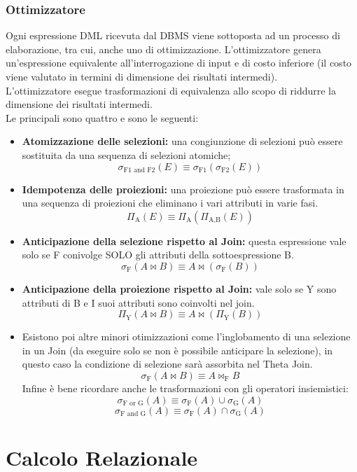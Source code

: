 \documentclass{report}
\begin{document}
\subsection{Ottimizzatore}
Ogni espressione DML ricevuta dal DBMS viene sottoposta ad un processo di elaborazione, tra cui, anche uno di ottimizzazione. L’ottimizzatore genera un’espressione equivalente all’interrogazione di input e di costo inferiore (il costo viene valutato in termini di dimensione dei risultati intermedi).\\
L’ottimizzatore esegue trasformazioni di equivalenza allo scopo di riddurre la dimensione dei risultati intermedi.\\
Le principali sono quattro e sono le seguenti:
\begin{itemize}
    \item \textbf{Atomizzazione delle selezioni:} una congiunzione di selezioni può essere sostituita da
una sequenza di selezioni atomiche;
$$\sigma_\text{F1 and F2}(E) \equiv \sigma_\text{F1}(\sigma_\text{F2}(E))$$
    \item \textbf{Idempotenza delle proiezioni:} una proiezione può essere trasformata in una sequenza
di proiezioni che eliminano i vari attributi in varie fasi.\\
$$\Pi_\text{A}(E) \equiv \Pi_\text{A}(\Pi_\text{A,B}(E))$$
    \item \textbf{Anticipazione della selezione rispetto al Join:} questa espressione vale solo se F conivolge SOLO gli attributi della sottoespressione B.\\
$$\sigma_\text{F}(A \bowtie B) \equiv A \bowtie(\sigma_\text{F}(B))$$
    \item \textbf{Anticipazione della proiezione rispetto al Join:} vale solo se Y sono attributi di B e I suoi attributi sono coinvolti nel join.\\
$$\Pi_\text{Y}(A \bowtie B) \equiv A \bowtie(\Pi_\text{Y}(B))$$
\newpage
    \item Esistono poi altre minori otimizzazioni come l'inglobamento di una selezione in un Join (da eseguire solo se non è possibile anticipare la selezione), in questo caso la condizione di selezione sarà assorbita nel Theta Join.\\
$$\sigma_\text{F}(A \bowtie B) \equiv A \bowtie_\text{F} B$$
    Infine è bene ricordare anche le trasformazioni con gli operatori insiemistici:\\
$$\sigma_\text{F or G}(A) \equiv \sigma_\text{F}(A) \cup \sigma_\text{G}(A)$$
$$\sigma_\text{F and G}(A) \equiv \sigma_\text{F}(A) \cap \sigma_\text{G}(A)$$
    
\end{itemize}



\newpage
\chapter{Calcolo Relazionale}
\end{document}
